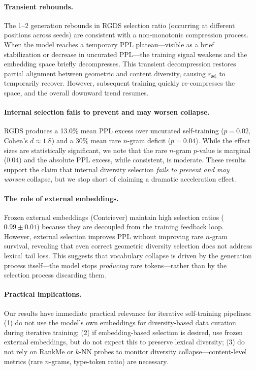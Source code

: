 \documentclass[11pt,a4paper]{article}
\newcommand{\ratio}{\ensuremath{r_{\text{sel}}}}
\begin{document}
\paragraph{Transient rebounds.}
The 1--2 generation rebounds in RGDS selection ratio (occurring at different positions across seeds) are consistent with a non-monotonic compression process.
When the model reaches a temporary PPL plateau---visible as a brief stabilization or decrease in uncurated PPL---the training signal weakens and the embedding space briefly decompresses.
This transient decompression restores partial alignment between geometric and content diversity, causing $\ratio$ to temporarily recover.
However, subsequent training quickly re-compresses the space, and the overall downward trend resumes.

\paragraph{Internal selection fails to prevent and may worsen collapse.}
RGDS produces a 13.0\% mean PPL excess over uncurated self-training ($p{=}0.02$, Cohen's $d \approx 1.8$) and a 30\% mean rare $n$-gram deficit ($p{=}0.04$).
While the effect sizes are statistically significant, we note that the rare $n$-gram $p$-value is marginal ($0.04$) and the absolute PPL excess, while consistent, is moderate.
These results support the claim that internal diversity selection \emph{fails to prevent and may worsen} collapse, but we stop short of claiming a dramatic acceleration effect.

\paragraph{The role of external embeddings.}
Frozen external embeddings (Contriever) maintain high selection ratios ($0.99 \pm 0.01$) because they are decoupled from the training feedback loop.
However, external selection improves PPL without improving rare $n$-gram survival, revealing that even correct geometric diversity selection does not address lexical tail loss.
This suggests that vocabulary collapse is driven by the generation process itself---the model stops \emph{producing} rare tokens---rather than by the selection process discarding them.

\paragraph{Practical implications.}
Our results have immediate practical relevance for iterative self-training pipelines:
(1) do not use the model's own embeddings for diversity-based data curation during iterative training;
(2) if embedding-based selection is desired, use frozen external embeddings, but do not expect this to preserve lexical diversity;
(3) do not rely on RankMe or $k$-NN probes to monitor diversity collapse---content-level metrics (rare $n$-grams, type-token ratio) are necessary.
\end{document}
